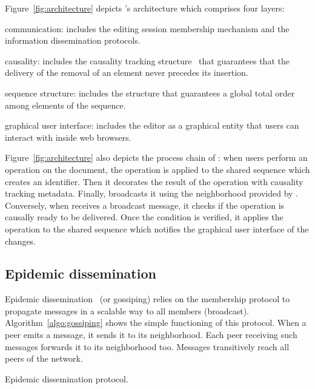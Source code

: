 Figure~\ref{fig:architecture} depicts \CRATE's architecture which comprises four
layers:
\begin{inparaenum}[(i)]
\item communication: includes the editing session membership mechanism and the
  information dissemination protocols.
\item causality: includes the causality tracking
  structure~\cite{malkhi2007concise} that guarantees that the delivery of the
  removal of an element never precedes its insertion.
\item sequence structure: includes the structure that guarantees a global
  total order among elements of the sequence.
\item graphical user interface: includes the editor as a graphical entity that
  users can interact with inside web browsers.
\end{inparaenum}
Figure~\ref{fig:architecture} also depicts the process chain of \CRATE: when
users perform an operation on the document, the operation is applied to the
shared sequence which creates an \LSEQ identifier. Then it decorates the result
of the operation with causality tracking metadata. Finally, \CRATE broadcasts it
using the neighborhood provided by \SPRAY.  Conversely, when \CRATE receives a
broadcast message, it checks if the operation is causally ready to be
delivered. Once the condition is verified, it applies the operation to the
shared sequence which notifies the graphical user interface of the changes.



\subsection{Epidemic dissemination}
\label{subsec:gossiping}

Epidemic dissemination~\cite{birman1999bimodal,demers1987epidemic} (or
gossiping) relies on the membership protocol to propagate messages in a scalable
way to all members (broadcast). Algorithm~\ref{algo:gossiping} shows the simple
functioning of this protocol. When a peer emits a message, it sends it to its
neighborhood. Each peer receiving such messages forwards it to its neighborhood
too. Messages transitively reach all peers of the network.

\begin{algorithm}[h]
  
  \caption{\label{algo:gossiping}Epidemic dissemination protocol.}
\end{algorithm}

